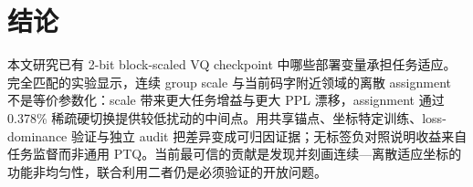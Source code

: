 \section{结论}

本文研究已有 2-bit block-scaled VQ checkpoint 中哪些部署变量承担任务适应。完全匹配的实验显示，连续 group scale 与当前码字附近领域的离散 assignment 不是等价参数化：scale 带来更大任务增益与更大 PPL 漂移，assignment 通过 0.378\% 稀疏硬切换提供较低扰动的中间点。\method 用共享锚点、坐标特定训练、loss-dominance 验证与独立 audit 把差异变成可归因证据；无标签负对照说明收益来自任务监督而非通用 PTQ。当前最可信的贡献是发现并刻画连续—离散适应坐标的功能非均匀性，联合利用二者仍是必须验证的开放问题。

